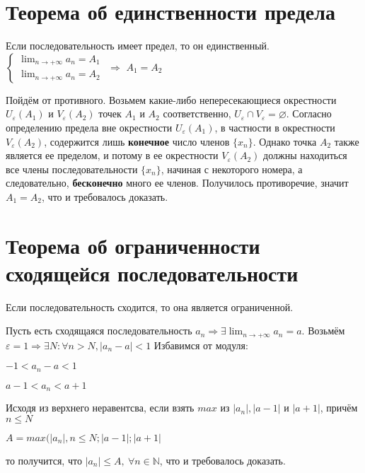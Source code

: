 \section{Теорема об единственности предела}
\begin{theorem}
Если последовательность имеет предел, то он единственный.\newline
$\begin{cases}\displaystyle \lim_{n \to +\infty} a_n = A_1 \\ \displaystyle \lim_{n \to +\infty} a_n 
= A_2\end{cases}$
$\Longrightarrow$ \qquad $\displaystyle A_1 = A_2$
\end{theorem}
Пойдём от противного. Возьмем какие-либо непересекающиеся окрестности $U_{\varepsilon}(A_1)$ и 
$V_{\varepsilon}(A_2)$ точек $A_1$ и $A_2$ соответственно, $U_{\varepsilon} \cap V_{\varepsilon} = 
\varnothing$.\newline
Согласно определению предела вне окрестности $U_{\varepsilon}(A_1)$, в частности в окрестности 
$V_{\varepsilon}(A_2)$, содержится лишь \textbf{конечное} число членов $\{x_n\}$. Однако точка $A_2$ 
также является ее пределом, и потому в ее окрестности $V_{\varepsilon}(A_2)$ должны находиться все 
члены последовательности $\{x_n\}$, начиная с некоторого номера, а следовательно, 
\textbf{бесконечно} много ее членов. Получилось противоречие, значит $A_1 = A_2$, что и требовалось 
доказать.

\section[Т. об огр. сход. посл.]{Теорема об ограниченности сходящейся последовательности}
\begin{theorem}
Если последовательность сходится, то она является ограниченной.
\end{theorem}
Пусть есть сходящаяся последовательность $a_n \Rightarrow \exists \displaystyle \lim_{n \to +\infty} 
a_n = a$. \newline 
Возьмём $\varepsilon = 1 \Rightarrow \exists N : \forall n > N, |a_n - a| < 1$ \newline
Избавимся от модуля: 
\begin{center} $-1 < a_n - a < 1$ \end{center}
\begin{center} $a - 1 < a_n < a + 1$ \end{center}
Исходя из верхнего неравентсва, если взять $max$ из $|a_n|, |a - 1|$ и $|a + 1|$, причём $n \leq N$
\begin{center} $A = max(|a_n|, n \leq N; |a - 1|; |a + 1|$ \end{center}
то получится, что $|a_n| \leq A, \ \forall n \in \mathbb{N}$, что и требовалось доказать.

